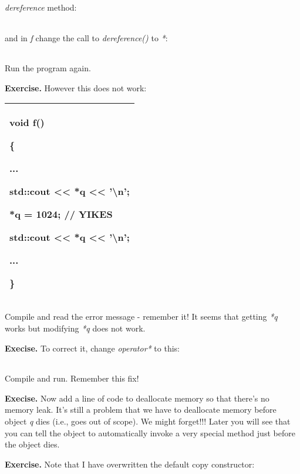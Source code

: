 \documentclass[
]{article}
\begin{document}
\emph{dereference} method:

\begin{longtable}[]{@{}@{}}
\toprule
\endhead
\bottomrule
\end{longtable}

and in \emph{f} change the call to \emph{dereference()} to \emph{*}:

\begin{longtable}[]{@{}@{}}
\toprule
\endhead
\bottomrule
\end{longtable}

Run the program again.

\textbf{Exercise.} However this does not work:

\begin{longtable}[]{@{}l@{}}
\toprule
\endhead
\begin{minipage}[t]{0.97\columnwidth}\raggedright
void f()

\{

...

std::cout \textless\textless{} *q \textless\textless{}
'\textbackslash n';

*q = 1024; // YIKES

std::cout \textless\textless{} *q \textless\textless{}
'\textbackslash n';

...

\}\strut
\end{minipage}\tabularnewline
\bottomrule
\end{longtable}

Compile and read the error message - remember it! It seems that getting
\emph{*q} works but modifying \emph{*q} does not work.

\textbf{Execise.} To correct it, change \emph{operator*} to this:

\begin{longtable}[]{@{}@{}}
\toprule
\endhead
\bottomrule
\end{longtable}

Compile and run. Remember this fix!

\textbf{Execise.} Now add a line of code to deallocate memory so that
there's no memory leak. It's still a problem that we have to deallocate
memory before object \emph{q} dies (i.e., goes out of scope). We might
forget!!! Later you will see that you can tell the object to
automatically invoke a very special method just before the object dies.

\textbf{Exercise.} Note that I have overwritten the default copy
constructor:
\end{document}
